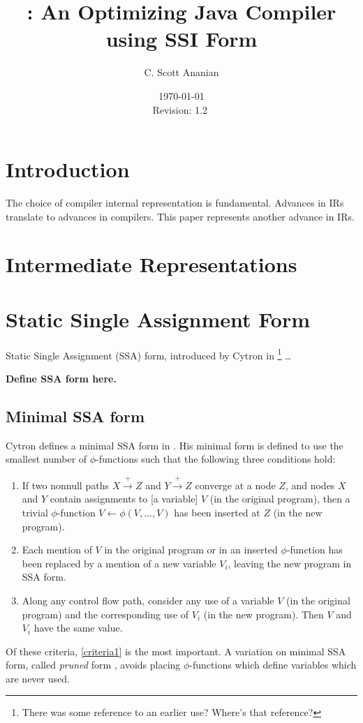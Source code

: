 \documentclass[notitlepage,twoside]{article}
\title{\magic: An Optimizing Java Compiler using SSI Form}
\author{C. Scott Ananian}
\date{\today \\ $ $Revision: 1.2 $ $}
\newcommand{\phifunction}{$\phi$-function}
\newcommand{\path}{\ensuremath{\rightarrow}}
\newcommand{\pathplus}{\ensuremath{\stackrel{+}{\path}}}
\begin{document}
\pagestyle{myheadings}


\maketitle

\section{Introduction}
The choice of compiler internal representation is fundamental.
Advances in IRs translate to advances in compilers.
This paper represents another advance in IRs.

\section{Intermediate Representations}
\section{Static Single Assignment Form}
Static Single Assignment (SSA) form, introduced by Cytron in
\cite{cytron89:ssa}%
\footnote{There was some reference to an earlier use? Where's that reference?}
\ldots

\textbf{Define SSA form here.}

\subsection{Minimal SSA form}
Cytron defines a minimal SSA form in \cite{cytron91:ssa}.  His minimal
form is defined to use the smallest number of \phifunction{s} such
that the following three conditions hold:
\begin{enumerate}
\item If two nonnull paths $X \pathplus Z$ and $Y \pathplus Z$
converge at a node $Z$, and nodes $X$ and $Y$ contain assignments to
[a variable] $V$ (in the original program), then a trivial
\phifunction{} $V \leftarrow \phi(V, \ldots, V)$ has been inserted at
$Z$ (in the new program). \label{criteria1}
\item Each mention of $V$ in the original program or in an inserted
\phifunction{} has been replaced by a mention of a new variable $V_i$,
leaving the new program in SSA form.
\item Along any control flow path, consider any use of a variable $V$
(in the original program) and the corresponding use of $V_i$ (in the
new program).  Then $V$ and $V_i$ have the same value.
\end{enumerate}
Of these criteria, \ref{criteria1} is the most important.  A variation
on minimal SSA form, called \textit{pruned} form \cite{ferrante91:pruned},
avoids placing \phifunction{s} which define variables which are never used.
\end{document}
